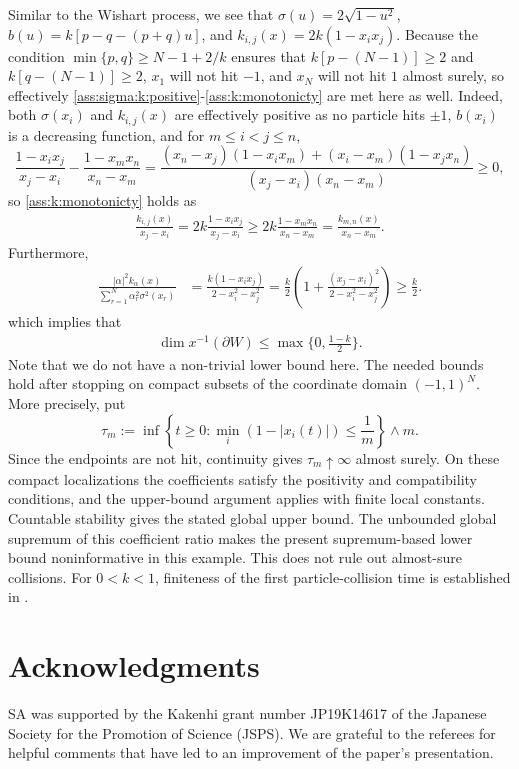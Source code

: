 \documentclass{article}
\numberwithin{equation}{section}
\newcommand{\C}{W}
\newcommand{\Cb}{\partial \C}
\theoremstyle{plain}
\begin{document}
    Similar to the Wishart process, we see that $\sigma(u)=2\sqrt{1-u^2}$, $b(u)=k[p-q-(p+q)u]$, and $k_{i,j}(x)=2k(1-x_ix_j)$. 
    Because the condition $\min\{p,q\}\geq N-1+2/k$ ensures that $k[p-(N-1)]\geq2$ and $k[q-(N-1)]\geq2$, $x_1$ will not hit $-1$, and $x_N$ will not hit $1$ almost surely, so effectively \ref{ass:sigma:k:positive}-\ref{ass:k:monotonicty} are met here as well.
    Indeed, both $\sigma(x_i)$ and $k_{i,j}(x)$ are effectively positive as no particle hits $\pm1$, $b(x_i)$ is a decreasing function, and for $m\leq i<j\leq n$,
    \[\frac{1-x_ix_j}{x_j-x_i}-\frac{1-x_mx_n}{x_n-x_m}=\frac{(x_n-x_j)(1-x_ix_m)+(x_i-x_m)(1-x_jx_n)}{(x_j-x_i)(x_n-x_m)}\geq0,\]
    so \ref{ass:k:monotonicty} holds as
    \begin{align*}
        \frac{k_{i,j}(x)}{x_j-x_i}=2k\frac{1-x_ix_j}{x_j-x_i}\geq 2k\frac{1-x_mx_n}{x_n-x_m}=\frac{k_{m,n}(x)}{x_n-x_m}.
    \end{align*}
    Furthermore,
    \begin{align}
        \frac{|\alpha|^2k_\alpha(x)}{\sum_{r=1}^N\alpha_r^2\sigma^2(x_r)}
        &=\frac{k(1-x_ix_j)}{2-x_i^2-x_j^2}=\frac{k}{2}\left(1+
        \frac{(x_j-x_i)^2}{2-x_i^2-x_j^2}\right)
        \geq\frac{k}{2}.
        \label{eq:jacobi:k:sigma}
    \end{align}
    which implies that
    \begin{align*}
        \dim x^{-1}(\Cb)\leq\max\Big\{0,\frac{1-k}2\Big\}.
    \end{align*}
    Note that we do not have a non-trivial lower bound here. The needed bounds hold after stopping on compact subsets of the coordinate domain $(-1,1)^N$. More precisely, put
    \[
        \tau_m:=\inf\left\{t\geq0:
             \min_i(1-|x_i(t)|)\leq\frac1m\right\}\wedge m.
    \]
    Since the endpoints are not hit, continuity gives $\tau_m\uparrow\infty$ almost surely. On these compact localizations the coefficients satisfy the positivity and compatibility conditions, and the upper-bound argument applies with finite local constants. Countable stability gives the stated global upper bound.
    The unbounded global supremum of this coefficient ratio makes the present supremum-based lower bound noninformative in this example. This does not rule out almost-sure collisions. For $0<k<1$, finiteness of the first particle-collision time is established in \cite[Proposition~3.1]{Demni10}.

\section*{Acknowledgments}
    SA was supported by the Kakenhi grant number JP19K14617 of the Japanese Society for the Promotion of Science (JSPS). We are grateful to the referees for helpful comments that have led to an improvement of the paper's presentation.

\end{document}
